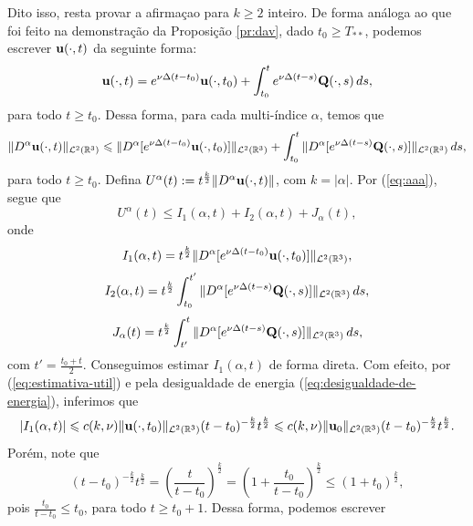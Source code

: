 \begin{prf}
    Dito isso, resta provar a afirmaçao para $k \geqslant 2$ inteiro. De forma análoga ao que foi feito na demonstração da Proposição \ref{pr:dav}, dado $t_0 \geqslant T_{**}$, podemos escrever $\mathbf{u}(\cdot,t)$ da seguinte forma:
    \[
        \mathbf{u}(\cdot,t) = e^{\nu \Delta(t-t_0)} \mathbf{u}(\cdot,t_0) + \int_{t_0}^{t} e^{\nu \Delta (t-s)} \mathbf{Q}(\cdot,s) \,ds,
    \]
    para todo $t \geqslant t_0$.
    Dessa forma, para cada multi-índice $\alpha$, temos que
    \begin{equation} \label{eq:aaa}
        \Vert D^\alpha \mathbf{u}(\cdot,t) \Vert_{\mathcal{L}^2(\mathbb{R}^3)} \leqslant \Vert D^\alpha [ e^{\nu \Delta(t-t_0)} \mathbf{u}(\cdot,t_0)] \Vert_{\mathcal{L}^2(\mathbb{R}^3)} + \int_{t_0}^t \Vert D^\alpha [e^{\nu \Delta (t-s)} \mathbf{Q}(\cdot,s)] \Vert_{\mathcal{L}^2(\mathbb{R}^3)} \,ds,
    \end{equation}
    para todo $t \geqslant t_0$.
    Defina $U^\alpha(t) := t^{\frac{k}{2}} \Vert D^\alpha \mathbf{u}(\cdot,t) \Vert$, com $k = |\alpha|$.
    Por (\ref{eq:aaa}), segue que
    \[
        U^\alpha(t) \leqslant I_1(\alpha,t) + I_2(\alpha,t) + J_\alpha(t),
    \]
    onde
    \[
        I_1(\alpha,t) = t^{\frac{k}{2}}\Vert D^\alpha [ e^{\nu \Delta(t-t_0)} \mathbf{u}(\cdot,t_0)] \Vert_{\mathcal{L}^2(\mathbb{R}^3)},
    \]
    \[
        I_2(\alpha,t) = t^{\frac{k}{2}}\int_{t_0}^{t'} \Vert D^\alpha [e^{\nu \Delta (t-s)} \mathbf{Q}(\cdot,s)] \Vert_{\mathcal{L}^2(\mathbb{R}^3)} \,ds,
    \]
    \begin{equation} \label{eq:Jalfa}
        J_\alpha(t) = t^{\frac{k}{2}}\int_{t'}^t \Vert D^\alpha [e^{\nu \Delta (t-s)} \mathbf{Q}(\cdot,s)] \Vert_{\mathcal{L}^2(\mathbb{R}^3)} \,ds,
    \end{equation}
    com $t' = \frac{t_0 + t}{2}$. Conseguimos estimar $I_1(\alpha, t)$ de forma direta.
    Com efeito, por (\ref{eq:estimativa-util}) e pela desigualdade de energia (\ref{eq:desigualdade-de-energia}), inferimos que
    \begin{equation} \label{eq:BB2}
        |I_1(\alpha,t)| \leqslant c(k,\nu) \Vert \mathbf{u}(\cdot,t_0) \Vert_{\mathcal{L}^2(\mathbb{R}^3)} (t - t_0)^{-\frac{k}{2}} t^{\frac{k}{2}} \leqslant c(k, \nu) \Vert \mathbf{u}_0 \Vert_{\mathcal{L}^2(\mathbb{R}^3)} (t - t_0)^{-\frac{k}{2}} t^{\frac{k}{2}}.
    \end{equation}
    Porém, note que
    \begin{equation} \label{eq:xxxx}
        (t - t_0)^{-\frac{k}{2}} t^{\frac{k}{2}} = \left( \frac{t}{t - t_0} \right)^{\! \frac{k}{2}} = \left( 1 + \frac{t_0}{t - t_0} \right)^{\! \frac{k}{2}} \leqslant (1 + t_0)^{\frac{k}{2}},
    \end{equation}
    pois $\frac{t_0}{t - t_0} \leqslant t_0$, para todo $t \geqslant t_0 + 1$. Dessa forma, podemos escrever

\end{prf}
